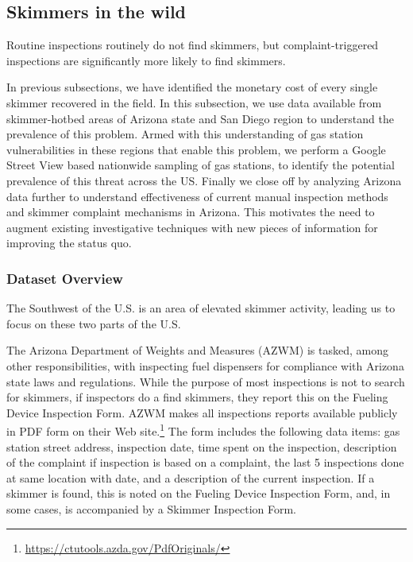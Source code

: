 \subsection{Skimmers in the wild} %
\label{sec:skimmersinwild}

\begin{table}
    \centering\small
    
    \caption{Routine inspections routinely do not find skimmers, but complaint-triggered inspections are significantly
    more likely to find skimmers.}
    \label{tab:azwm-results}
\end{table}

In previous subsections, we have identified the monetary cost of every single skimmer recovered in the field. In this subsection, we use data available from skimmer-hotbed areas of Arizona state and San Diego region to understand the prevalence of this problem. Armed with this understanding of gas station vulnerabilities in these regions that enable this problem, we perform a Google Street View based nationwide sampling of gas stations, to identify the potential prevalence of this threat across the US. Finally we close off by analyzing Arizona data further to understand effectiveness of current manual inspection methods and skimmer complaint mechanisms in Arizona. This motivates the need to augment existing investigative techniques with new pieces of information for improving the status quo.

\subsubsection*{Dataset Overview}

The Southwest of the U.S. is an area of elevated skimmer activity, leading us to focus on these two parts of the U.S.

The Arizona Department of Weights and Measures (AZWM) is tasked, among other responsibilities, with inspecting fuel dispensers for compliance with Arizona state laws and regulations. While the purpose of most inspections is not to search for skimmers, if inspectors do a find skimmers, they report this on the Fueling Device Inspection Form. AZWM makes all inspections reports available publicly in PDF form on their Web site.\footnote{\url{https://ctutools.azda.gov/PdfOriginals/}} The form includes the following data items: gas station street address, inspection date, time spent on the inspection, description of the complaint if inspection is based on a complaint, the last 5 inspections done at same location with date, and a description of the current inspection. If a skimmer is found, this is noted on the Fueling Device Inspection Form, and, in some cases, is accompanied by a Skimmer Inspection Form.

